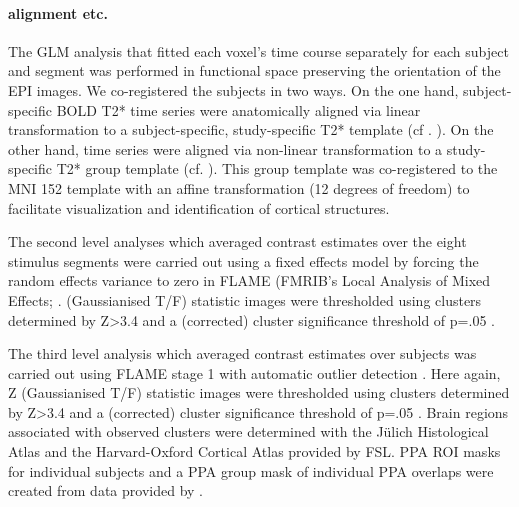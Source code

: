 \documentclass[english]{article}
\begin{document}
\paragraph{alignment etc.}

The GLM analysis that fitted each voxel's time course separately for each
subject and segment was performed in functional space preserving the orientation
of the EPI images.
We co-registered the subjects in two ways.
On the one hand, subject-specific BOLD T2* time series were anatomically aligned
via linear transformation to a subject-specific, study-specific T2* template (cf
. \citep{sengupta2016extension}).
On the other hand, time series were aligned via non-linear transformation to a
study-specific T2* group template (cf. \citep{hanke2014audiomovie}).
This group template was co-registered to the MNI 152 template with an affine
transformation (12 degrees of freedom) to facilitate visualization and
identification of cortical structures.

The second level analyses which averaged contrast estimates over the eight
stimulus segments were carried out using a fixed effects model by forcing the
random effects variance to zero in FLAME (FMRIB's Local Analysis of Mixed
Effects; \citep{beckmann2003general, woolrich2004multilevel}.
(Gaussianised T/F) statistic images were thresholded using clusters determined
by Z>3.4 and a (corrected) cluster significance threshold of p=.05
\citep{worsley2001statistical}.

The third level analysis which averaged contrast estimates over subjects was
carried out using FLAME stage 1 with automatic outlier detection
\citep{beckmann2003general, woolrich2004multilevel, woolrich2008robust}.
Here again, Z (Gaussianised T/F) statistic images were thresholded using
clusters determined by Z>3.4 and a (corrected) cluster significance threshold of
p=.05 \citep{worsley2001statistical}.
Brain regions associated with observed clusters were determined with the Jülich
Histological Atlas \citep{eickhoff2005toolbox, eickhoff2007assignment} and the
Harvard-Oxford Cortical Atlas \citep{desikan2006automated} provided by FSL.
PPA ROI masks for individual subjects and a PPA group mask of individual PPA
overlaps were created from data provided by \citep{sengupta2016extension}.
\end{document}
